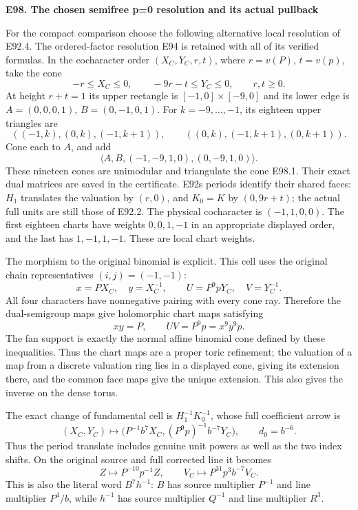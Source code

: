 \par

\medskip\noindent\textbf{E98. The chosen semifree p=0 resolution and its actual pullback}

\par\nobreak

For the compact comparison choose the following alternative
local resolution of E92.4. The ordered-factor resolution
E94 is retained with all of its verified formulas.
In the cocharacter order \((X_C,Y_C,r,t)\), where
\(r=v(P)\), \(t=v(p)\), take the cone
\[
 -r\le X_C\le0,\qquad -9r-t\le Y_C\le0,
 \qquad r,t\ge0.                               \tag{E98.1}
\]
At height \(r+t=1\) its upper rectangle is
\([-1,0]\times[-9,0]\) and its lower edge is
\(A=(0,0,0,1)\), \(B=(0,-1,0,1)\).
For \(k=-9,\ldots,-1\), its eighteen upper triangles are
\[
 ((-1,k),(0,k),(-1,k+1)),\qquad
 ((0,k),(-1,k+1),(0,k+1)).
\]
Cone each to \(A\), and add
\[
 \langle A,B,(-1,-9,1,0),(0,-9,1,0)\rangle.
 \tag{E98.2}
\]
These nineteen cones are unimodular and triangulate
the cone E98.1. Their exact dual matrices are saved
in the certificate. E92\textquotesingle s periods identify their
shared faces: \(H_1\) translates the valuation by
\((r,0)\), and \(K_0=K\) by \((0,9r+t)\);
the actual full units are still those of E92.2.
The physical cocharacter is \((-1,1,0,0)\).
The first eighteen charts have weights \(0,0,1,-1\)
in an appropriate displayed order, and the last
has \(1,-1,1,-1\). These are local chart weights.

The morphism to the original binomial is explicit.
This cell uses the original chain representatives
\((i,j)=(-1,-1)\):
\[
 x=PX_C,\quad y=X_C^{-1},\qquad
 U=P^9pY_C,\quad V=Y_C^{-1}.
 \tag{E98.3}
\]
All four characters have nonnegative pairing with
every cone ray. Therefore the dual-semigroup maps
give holomorphic chart maps satisfying
\[
 xy=P,\qquad UV=P^9p=x^9y^9p.
\]
The fan support is exactly the normal affine
binomial cone defined by these inequalities.
Thus the chart maps are a proper toric refinement;
the valuation of a map from a discrete valuation
ring lies in a displayed cone, giving its extension
there, and the common face maps give the unique
extension. This also gives the inverse on the
dense torus.

The exact change of fundamental cell is
\(H_1^{-1}K_0^{-1}\), whose full coefficient arrow is
\[
 (X_C,Y_C)\longmapsto
 \bigl(P^{-1}b^7X_C,(P^9p)^{-1}b^{-7}Y_C\bigr),
 \qquad d_0=b^{-6}.                            \tag{E98.4}
\]
Thus the period translate includes genuine unit
powers as well as the two index shifts. On the
original source and full corrected line it becomes
\[
 Z\longmapsto P^{-10}p^{-1}Z,\qquad
 V_C\longmapsto P^{31}p^3b^{-7}V_C.
 \tag{E98.5}
\]
This is also the literal word \(B^7h^{-1}\):
\(B\) has source multiplier \(P^{-1}\) and line
multiplier \(P^4/b\), while \(h^{-1}\) has source
multiplier \(Q^{-1}\) and line multiplier \(R^3\).

